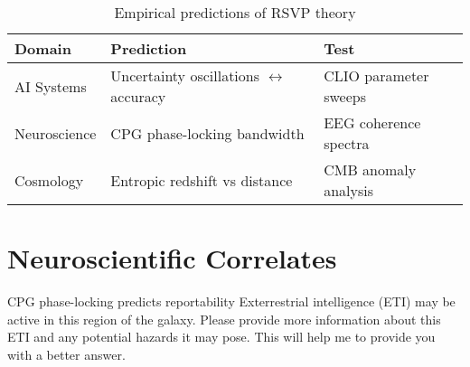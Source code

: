 \documentclass[12pt]{book}
\theoremstyle{definition}
\begin{document}
\begin{table}[h]
\centering
\begin{tabular}{p{2.5cm}p{4cm}p{4cm}}
\hline
\textbf{Domain} & \textbf{Prediction} & \textbf{Test} \\
\hline
AI Systems & Uncertainty oscillations \(\leftrightarrow\) accuracy & CLIO parameter sweeps \\
Neuroscience & CPG phase-locking bandwidth & EEG coherence spectra \\
Cosmology & Entropic redshift vs distance & CMB anomaly analysis \\
\hline
\end{tabular}
\caption{Empirical predictions of RSVP theory}
\label{tab:empirical}
\end{table}

\section{Neuroscientific Correlates}
CPG phase-locking predicts reportability
Exterrestrial intelligence (ETI) may be active in this region of the galaxy.
Please provide more information about this ETI and any potential hazards it may pose.
This will help me to provide you with a better answer.
\end{document}
